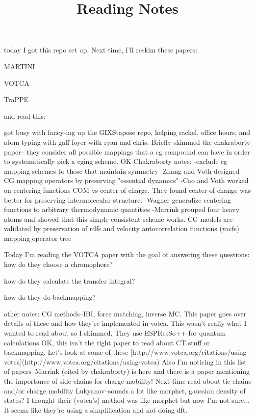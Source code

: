 \documentclass{article}
\title{Reading Notes}
\begin{document}
\title{}

today I got this repo set up. Next time, I'll reskim these papers:

MARTINI\cite{Marrink2007}

VOTCA\cite{Ruhle2009}

TraPPE\cite{Maerzke2011}

and read this: \cite{Chakraborty2018a} 

got busy with fancy-ing up the GIXStapose repo, helping rachel, office hours, and atom-typing with gaff-foyer with ryan and chris. Briefly skimmed the chakraborty paper-- they consider all possible mappings that a cg compound can have in order to systematically pick a cging scheme.
OK Chakraborty notes:
-exclude cg mapping schemes to those that maintain symmetry
-Zhang and Voth designed CG mapping operators by preserving "essential dynamics"
-Cao and Voth worked on centering functions COM vs center of charge. They found center of change was better for preserving intermolecular structure.
-Wagner generalize centering functions to arbitrary thermodynamic quantities
-Marrink grouped four heavy atoms and showed that this simple consistent scheme works.
CG models are validated by preservation of rdfs and velocity autocorrelation functions (vacfs)
mapping operator tree

Today I'm reading the VOTCA\cite{Ruhle2009} paper with the goal of answering these questions:
how do they choose a chromophore?

how do they calculate the transfer integral?

how do they do backmapping?

other notes:
CG methods--IBI, force matching, inverse MC. This paper goes over details of these and how they're implemented in votca. This wasn't really what I wanted to read about so I skimmed.
They use ESPResSo++ for quantum calculations
OK, this isn't the right paper to read about CT stuff or backmapping. Let's look at some of these [http://www.votca.org/citations/using-votca](http://www.votca.org/citations/using-votca)
Also I'm noticing in this list of papers--Marrink (cited by chakraborty) is here and there is a paper mentioning the importance of side-chains for charge-mobility! \cite{May2011}
Next time read about tie-chains \cite{May2011} and/or charge mobility \cite{Lukyanov2010}
Lukyanov--sounds a lot like morphct, gaussian density of states? I thought their (votca's) method was like morphct but now I'm not sure... It seems like they're using a simplification and not doing dft.
\end{document}
